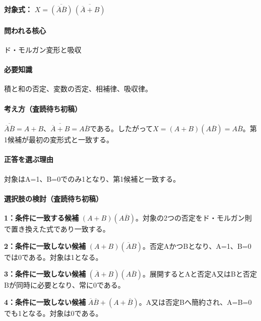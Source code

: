 \noindent\textbf{対象式：} \(X=\overline{(\overline A\overline B)}\,\overline{(\overline A+B)}\)\par

\paragraph{問われる核心} ド・モルガン変形と吸収

\paragraph{必要知識} 積と和の否定、変数の否定、相補律、吸収律。

\paragraph{考え方（査読待ち初稿）} \(\overline{\overline A\overline B}=A+B\)、\(\overline{\overline A+B}=A\overline B\)である。したがって\(X=(A+B)(A\overline B)=A\overline B\)。第1候補が最初の変形式と一致する。

\paragraph{正答を選ぶ理由} 対象はA=\allowbreak{}1、B=\allowbreak{}0でのみ1となり、第1候補と一致する。

\paragraph{選択肢の検討（査読待ち初稿）}\mbox{}\par

\noindent\textbf{1：条件に一致する候補} \((A+B)(A\overline B)\)。対象の2つの否定をド・モルガン則で置き換えた式であり一致する。\par

\noindent\textbf{2：条件に一致しない候補} \((A+B)(\overline A B)\)。否定AかつBとなり、A=\allowbreak{}1、B=\allowbreak{}0では0である。対象は1となる。\par

\noindent\textbf{3：条件に一致しない候補} \((\overline A+B)(A\overline B)\)。展開するとAと否定A又はBと否定Bが同時に必要となり、常に0である。\par

\noindent\textbf{4：条件に一致しない候補} \(\overline A\overline B+(A+\overline B)\)。A又は否定Bへ簡約され、A=\allowbreak{}B=\allowbreak{}0でも1となる。対象は0である。\par

